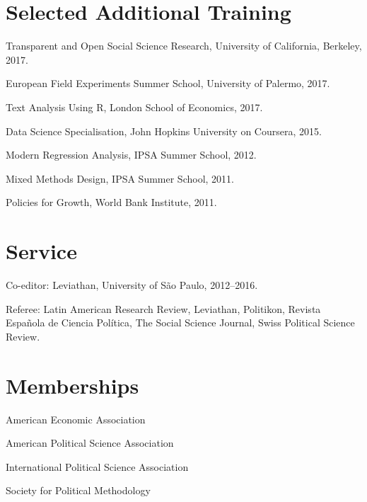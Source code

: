 \documentclass[a4paper]{article}
\renewenvironment{itemize}{
	\begin{list}{}{
			\setlength{\leftmargin}{1.5em}
		}
		}{
	\end{list}
}
\begin{document}
	\section*{Selected Additional Training}

	\begin{itemize}
		\item Transparent and Open Social Science Research, University of California, Berkeley, 2017. %
		\item European Field Experiments Summer School, University of Palermo, 2017.
		\item Text Analysis Using R, London School of Economics, 2017.
		\item Data Science Specialisation, John Hopkins University on Coursera, 2015.
		\item Modern Regression Analysis, IPSA Summer School, 2012.
		\item Mixed Methods Design, IPSA Summer School, 2011.
		\item Policies for Growth, World Bank Institute, 2011.
	\end{itemize}

	\section*{Service}

	\begin{itemize}
		\item Co-editor: Leviathan, University of São Paulo, 2012--2016.
		\item Referee: Latin American Research Review, Leviathan, Politikon,
		Revista Española de Ciencia Política, The Social Science Journal, Swiss
		Political Science Review.
	\end{itemize}

	\section*{Memberships}

	\begin{itemize}
		\item American Economic Association
		\item American Political Science Association
		\item International Political Science Association
		\item Society for Political Methodology
	\end{itemize}
\end{document}
